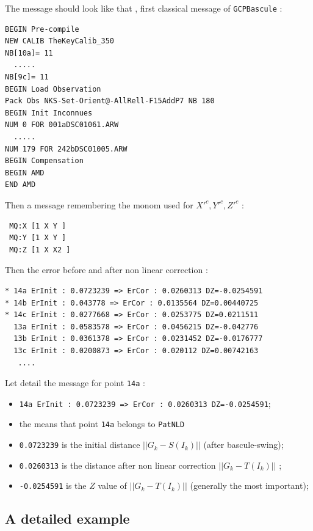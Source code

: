The message should look like that , first classical message of {\tt GCPBascule} :

\begin{verbatim}
BEGIN Pre-compile
NEW CALIB TheKeyCalib_350
NB[10a]= 11
  .....
NB[9c]= 11
BEGIN Load Observation
Pack Obs NKS-Set-Orient@-AllRell-F15AddP7 NB 180
BEGIN Init Inconnues
NUM 0 FOR 001aDSC01061.ARW
  .....
NUM 179 FOR 242bDSC01005.ARW
BEGIN Compensation
BEGIN AMD
END AMD
\end{verbatim}

Then  a message remembering the monom used for $X'^c,Y'^c,Z'^c$ :

\begin{verbatim}
 MQ:X [1 X Y ]
 MQ:Y [1 X Y ]
 MQ:Z [1 X X2 ]
\end{verbatim}

Then the error before and after non linear correction :

\begin{verbatim}
* 14a ErInit : 0.0723239 => ErCor : 0.0260313 DZ=-0.0254591
* 14b ErInit : 0.043778 => ErCor : 0.0135564 DZ=0.00440725
* 14c ErInit : 0.0277668 => ErCor : 0.0253775 DZ=0.0211511
  13a ErInit : 0.0583578 => ErCor : 0.0456215 DZ=-0.042776
  13b ErInit : 0.0361378 => ErCor : 0.0231452 DZ=-0.0176777
  13c ErInit : 0.0200873 => ErCor : 0.020112 DZ=0.00742163
   ....
\end{verbatim}

Let detail the message for point {\tt  14a} :
\begin{itemize}

 \item {\tt * 14a ErInit : 0.0723239 => ErCor : 0.0260313 DZ=-0.0254591};
 \item the {\tt *} means that point {\tt  14a} belongs to {\tt PatNLD}
 \item {\tt 0.0723239} is the initial distance $||G_k - S(I_k)||$ (after bascule-swing);
 \item {\tt 0.0260313} is the distance after non linear correction $||G_k - T(I_k)||$ ;
 \item {\tt -0.0254591} is the $Z$ value of $||G_k - T(I_k)||$ (generally the most important);

\end{itemize}





\subsection{A detailed example}


























